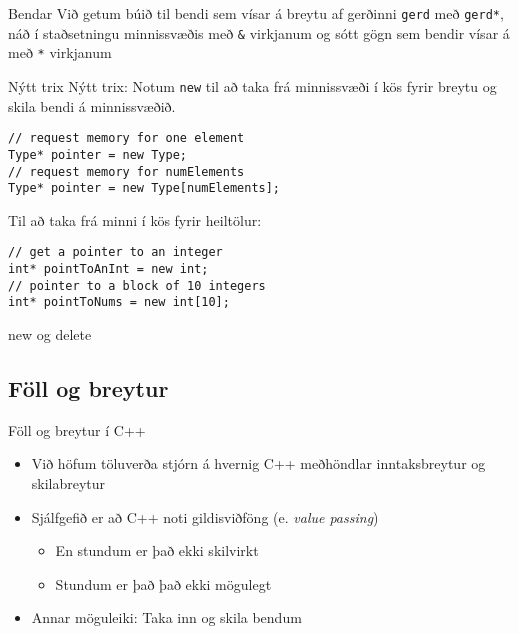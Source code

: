 \documentclass[handout]{beamer}
\begin{document}
\begin{frame}[fragile]{Bendar}
Við getum búið til bendi sem vísar á breytu af gerðinni \texttt{gerd} með \texttt{gerd*}, náð í  staðsetningu minnissvæðis með \texttt{\&} virkjanum og sótt gögn sem bendir vísar á með \texttt{*} virkjanum

\end{frame}

\begin{frame}[fragile]{Nýtt trix}
Nýtt trix: Notum \texttt{new} til að taka frá minnissvæði í kös fyrir breytu og skila bendi á minnissvæðið.
\begin{verbatim}
// request memory for one element
Type* pointer = new Type;
// request memory for numElements
Type* pointer = new Type[numElements];
\end{verbatim}
Til að taka frá minni í kös fyrir heiltölur:
\begin{verbatim}
// get a pointer to an integer
int* pointToAnInt = new int;
// pointer to a block of 10 integers
int* pointToNums = new int[10];
\end{verbatim}
\end{frame}

\begin{frame}[fragile]{new og delete}


\end{frame}

\subsection{Föll og breytur}

\begin{frame}{Föll og breytur í C++}
\begin{itemize}
 \item Við höfum töluverða stjórn á hvernig C++ meðhöndlar inntaksbreytur og skilabreytur
 \item Sjálfgefið er að C++ noti gildisviðföng (e. \emph{value passing})
 \begin{itemize}
  \item En stundum er það ekki skilvirkt
  \item Stundum er það það ekki mögulegt
 \end{itemize}
 \item Annar möguleiki: Taka inn og skila bendum
\end{itemize}
\end{frame}
\end{document}
